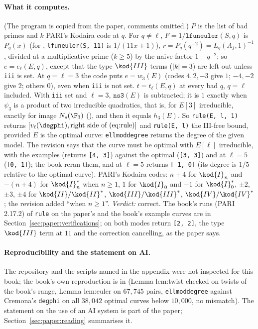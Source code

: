 \begin{sloppypar}
\paragraph{What it computes.} (The program is copied from the paper, comments omitted.) $P$ is the list of bad primes and $k$ PARI's Kodaira code at $q$. For $q\ne\ell$, $F=1/\texttt{lfuneuler}(S,q)$
is $P_q(x)$ (for , \texttt{lfuneuler(S, 11)} is $1/(11x+1)$), $r=P_q(q^{-2})=L_q(A_f,1)^{-1}$, divided at a multiplicative prime ($k\ge5$) by the naive factor $1-q^{-2}$; so $e=e_\ell(E,q)$,
except that the type $\kod{III}$ terms ($|k|=3$) are left out unless \texttt{iii} is set. At $q=\ell=3$ the code puts $e=w_3(E)$ (codes $4,2,-3$ give $1$; $-4,-2$ give $2$; others $0$), even when
\texttt{iii} is not set. $t=t_\ell(E,q)$ at every bad $q$, $q=\ell$ included. With \texttt{iii} set and $\ell=3$, $\texttt{ns3}(E)$ is subtracted; it is $1$ exactly when $\psi_3$ is a product of two
irreducible quadratics, that is, for $E[3]$ irreducible, exactly for image $N_s(\F_3)$ (), and then it equals $h_3(E)$. So \texttt{rule(E, l, 1)} returns $[v_\ell(\degphi),\text{right side
of (eq:rule)}]$ and \texttt{rule(E, l)} the III-free bound, provided $E$ is the optimal curve: \texttt{ellmoddegree} returns the degree of the given model. The revision says that the curve must be
optimal with $E[\ell]$ irreducible, with the examples  (returns \texttt{[4, 3]}) against the optimal  (\texttt{[3, 3]}) and  at $\ell=5$ (\texttt{[0, 1]}); the book
reran them, and  at $\ell=5$ returns \texttt{[-1, 0]} (its degree is $1/5$ relative to the optimal curve). PARI's Kodaira codes: $n+4$ for $\kod{I}_n$ and $-(n+4)$ for $\kod{I}_n^*$ when $n\ge1$,
$1$ for $\kod{I}_0$ and $-1$ for $\kod{I}_0^*$, $\pm2$, $\pm3$, $\pm4$ for $\kod{II}/\kod{II}^*$, $\kod{III}/\kod{III}^*$, $\kod{IV}/\kod{IV}^*$; the revision added ``when $n\ge1$''. \emph{Verdict:} correct. The book's runs (PARI
2.17.2) of \texttt{rule} on the paper's and the book's example curves are in Section~\ref{sec:paper:verifications}; on  both modes return \texttt{[2, 2]}, the type $\kod{III}$ term at $11$ and the
correction cancelling, as the paper says.

\paragraph{Reproducibility and the statement on AI.} The repository and the scripts named in the appendix were not inspected for this book; the book's own reproduction is in
 (Lemma lem:twist checked on twists of the book's range, Lemma lem:euler on $67{,}745$ pairs, \texttt{ellmoddegree} against Cremona's \texttt{degphi} on all $38{,}042$ optimal curves below
$10{,}000$, no mismatch). The statement on the use of an AI system is part of the paper; Section~\ref{sec:paper:reading} summarises it.


\end{sloppypar}
